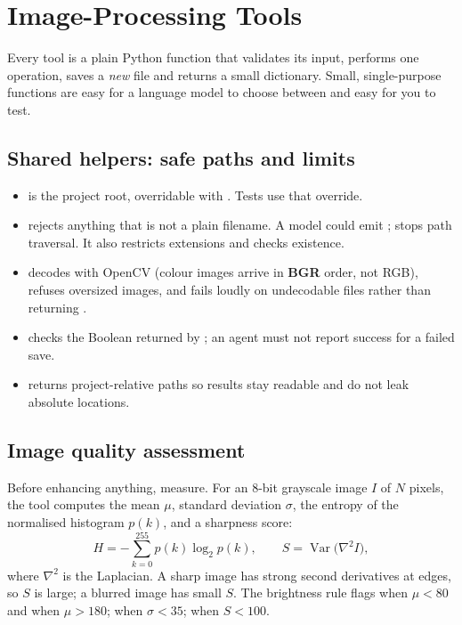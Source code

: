 \chapter{Image-Processing Tools}
Every tool is a plain Python function that validates its input, performs one operation, saves a \emph{new} file and returns a small dictionary. Small, single-purpose functions are easy for a language model to choose between and easy for you to test.

\section{Shared helpers: safe paths and limits}

\begin{itemize}
  \item {} is the project root, overridable with . Tests use that override.
  \item {} rejects anything that is not a plain filename. A model could emit ;  stops path traversal. It also restricts extensions and checks existence.
  \item {} decodes with OpenCV (colour images arrive in \textbf{BGR} order, not RGB), refuses oversized images, and fails loudly on undecodable files rather than returning .
  \item {} checks the Boolean returned by ; an agent must not report success for a failed save.
  \item {} returns project-relative paths so results stay readable and do not leak absolute locations.
\end{itemize}

\section{Image quality assessment}
Before enhancing anything, measure. For an 8-bit grayscale image $I$ of $N$ pixels, the tool computes the mean $\mu$, standard deviation $\sigma$, the entropy of the normalised histogram $p(k)$, and a sharpness score:
\[
H = -\sum_{k=0}^{255} p(k)\log_2 p(k), \qquad
S = \operatorname{Var}\!\big(\nabla^2 I\big),
\]
where $\nabla^2$ is the Laplacian. A sharp image has strong second derivatives at edges, so $S$ is large; a blurred image has small $S$. The brightness rule flags  when $\mu<80$ and  when $\mu>180$;  when $\sigma<35$;  when $S<100$.

